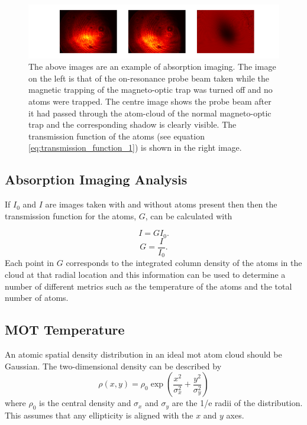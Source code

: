 \begin{figure}[h]
\centering
\includegraphics[width=18cm]{figs/absorptionexample.pdf}
\caption{The above images are an example of absorption imaging.  The image on the left is that of the on-resonance probe beam taken while the magnetic trapping of the magneto-optic trap was turned off and no atoms were trapped. The centre image shows the probe beam after it had passed through the atom-cloud of the normal magneto-optic trap and the corresponding shadow is clearly visible. The transmission function of the atoms (see equation \ref{eq:transmission_function_1}) is shown in the right image.}
\label{fig:absorption_example}
\end{figure}

\subsection{Absorption Imaging Analysis}
\label{sec:absorption_imaging}
If $I_0$ and $I$ are images taken with and without atoms present then then the transmission function for the atoms, $G$, can be calculated with

\begin{equation}
I = G I_0.
\end{equation}
\begin{equation}\label{eq:transmission_function_1}
G = \frac{I}{I_0}.
\end{equation}
Each point in $G$ corresponds to the integrated column density of the atoms in the cloud at that radial location and this information can be used to determine a number of different metrics such as the temperature of the atoms and the total number of atoms.

\subsection{MOT Temperature}
\label{temp_measurement}
An atomic spatial density distribution in an ideal \gls{mot} atom cloud should be Gaussian. The two-dimensional density can be described by
\begin{equation}\label{eq:gaussian_density}
\rho (x, y) = \rho_0\exp\left(\frac{x^2}{\sigma_x^2} + \frac{y^2}{\sigma_y^2}\right)
\end{equation}
where $\rho_0$ is the central density and $\sigma_x$ and $\sigma_y$ are the 1/e radii of the distribution. This assumes that any ellipticity is aligned with the $x$ and $y$ axes.

